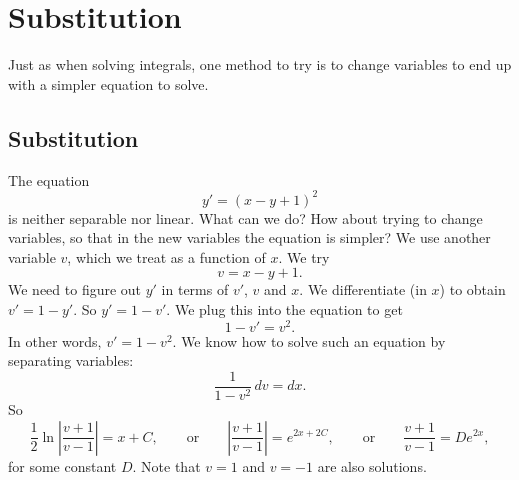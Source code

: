 
\sectionnewpage
\section{Substitution}
\label{substitution:section}



Just as when solving integrals, one method to try is to change variables to
end up with a simpler equation to solve.

\subsection{Substitution}

The equation
\begin{equation*}
y' = {(x-y+1)}^2
\end{equation*}
is neither separable nor linear.  What can we do?
How about trying to change variables, so that in the new variables the
equation is simpler?  We use another variable $v$, which we treat as
a function of $x$.  We try
\begin{equation*}
v = x-y+1 .
\end{equation*}
We need to figure out
$y'$ in terms of $v'$, $v$ and $x$.  We differentiate (in $x$) to
obtain $v' = 1 - y'$.  So $y' = 1-v'$.  We plug this into the equation to get
\begin{equation*}
1-v' = v^2 .
\end{equation*}
In other words, $v' = 1-v^2$.  We know how to solve such an equation by
separating variables:
\begin{equation*}
\frac{1}{1-v^2} \,dv = dx .
\end{equation*}
So
\begin{equation*}
\frac{1}{2} \ln \left\lvert  \frac{v+1}{v-1} \right\rvert = x + C ,
\qquad \text{or} \qquad
\left\lvert \frac{v+1}{v-1} \right\rvert = e^{2x + 2C} ,
\qquad \text{or} \qquad
\frac{v+1}{v-1} = D e^{2x} ,
\end{equation*}
for some constant $D$.
Note that $v=1$ and $v=-1$ are also solutions.


